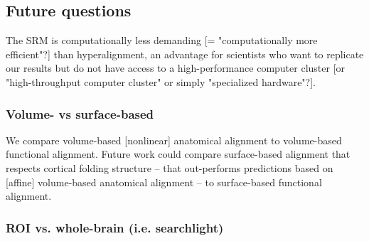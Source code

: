 \subsection{Future questions}


The SRM is computationally less demanding [= "computationally more efficient"?]
than hyperalignment, an advantage for scientists who want to replicate our
results but do not have access to a high-performance computer cluster [or
"high-throughput computer cluster" or simply "specialized hardware"?].


\subsubsection{Volume- vs surface-based}



We compare volume-based [nonlinear] anatomical alignment to volume-based
functional alignment.
%
Future work could compare surface-based alignment that respects cortical folding
structure -- that out-performs predictions based on [affine] volume-based
anatomical alignment \citep{weiner2018defining} -- to surface-based functional
alignment.


\subsubsection{ROI vs. whole-brain (i.e. searchlight)}



